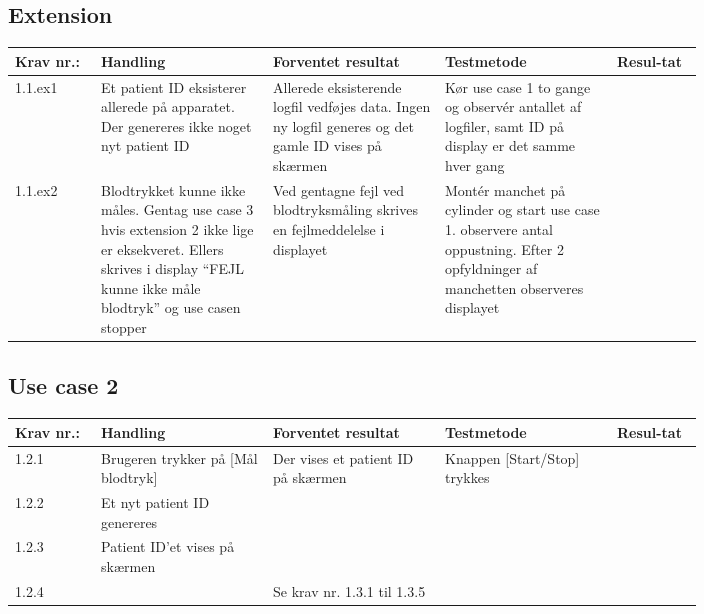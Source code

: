 		\subsection*{Extension}
			\begin{longtable}{|p{0.1\linewidth}|p{0.2\linewidth}|p{0.2\linewidth}|p{0.2\linewidth}|p{0.1\linewidth}|}
				\hline
				Krav nr.: & Handling & Forventet resultat & Testmetode & Resul-tat  \\\hline
				1.1.ex1 & Et patient ID eksisterer allerede på apparatet. Der genereres ikke noget nyt patient ID & Allerede eksisterende logfil vedføjes data. Ingen ny logfil generes og det gamle ID vises på skærmen & Kør use case 1 to gange og observér antallet af logfiler, samt ID på display er det samme hver gang &  \\
				\hline
				1.1.ex2 & Blodtrykket kunne ikke måles. Gentag use case 3 hvis extension 2 ikke lige er eksekveret. Ellers skrives i display “FEJL kunne ikke måle blodtryk” og use casen stopper  & Ved gentagne fejl ved blodtryksmåling skrives en fejlmeddelelse i displayet & Montér manchet på cylinder og start use case 1. observere antal oppustning. Efter 2 opfyldninger af manchetten observeres displayet & \\ \hline
			\end{longtable}

	\subsection{Use case 2}
		\begin{longtable}{|p{0.1\linewidth}|p{0.2\linewidth}|p{0.2\linewidth}|p{0.2\linewidth}|p{0.1\linewidth}|}
			\hline
			Krav nr.: & Handling & Forventet resultat & Testmetode & Resul-tat  \\\hline
			1.2.1 & Brugeren trykker på [Mål blodtryk] & \multirow{3}{\linewidth}{Der vises et patient ID på skærmen} & \multirow{3}{\linewidth}{Knappen [Start/Stop] trykkes} & \multirow{3}{\linewidth}{}  \\ \cline{1-2} 
			1.2.2 & Et nyt patient ID genereres & & &  \\ \cline{1-2}
			1.2.3 & Patient ID’et vises på skærmen & & &  \\ \hline
			1.2.4 & & \multicolumn{3}{l|}{Se krav nr. 1.3.1 til 1.3.5} \\ 
			\hline
			
		\end{longtable}
	
